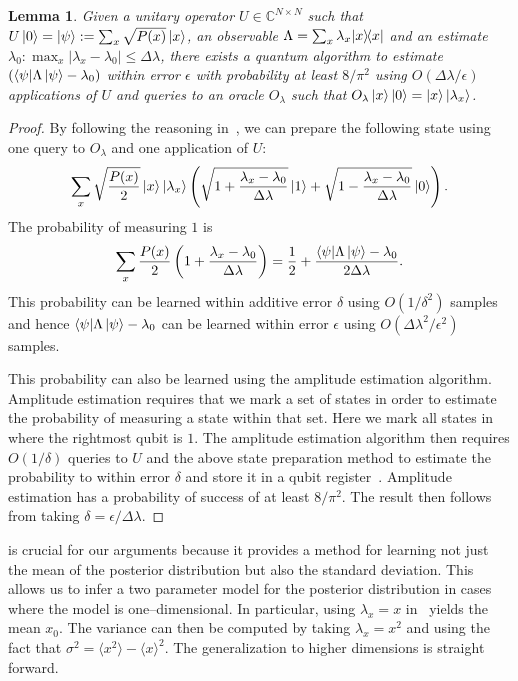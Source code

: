 \documentclass[aps,amsmath,onecolumn,amssymb]{revtex4}
\newtheorem{lemma}{Lemma}
\begin{document}
\begin{lemma}
Given a unitary operator $U\in \mathbb{C}^{N\times N}$ such that $U\left|0\right\rangle=\left|\psi\right\rangle:=\sum_x \sqrt{P(x)} \left|x\right\rangle$, an observable $\Lambda=\sum_x \lambda_x |x\rangle\!\langle x|$ and an estimate $\lambda_0:\max_x|\lambda_x-\lambda_0|\le \Delta\lambda$, there exists a quantum algorithm to estimate $(\langle\psi| \Lambda\left|\psi\right\rangle -\lambda_0)$ within error $\epsilon$ with probability at least $8/\pi^2$ using $ O(\Delta\lambda/\epsilon)$ applications of $U$ and queries to an oracle $O_\lambda$ such that $O_\lambda\left|x\right\rangle\left|0\right\rangle= \left|x\right\rangle\left|\lambda_x\right\rangle$.\label{lem:ampest}
\end{lemma}
\begin{proof}
By following the reasoning in~, we can prepare the following state using one query to $O_\lambda$ and one application of $U$:
\begin{equation}
\sum_{x} \sqrt{\frac{P(x)}{2}} \left|x\right\rangle\left|\lambda_x\right\rangle\left(\sqrt{1+\frac{\lambda_x-\lambda_0 }{\Delta \lambda}}\left|1\right\rangle + \sqrt{1-\frac{\lambda_x-\lambda_0 }{\Delta \lambda}}\left|0\right\rangle \right).\label{eq:hadtest}
\end{equation}
The probability of measuring $1$ is 
\begin{equation}
\sum_x \frac{P(x)}{2} \left(1+ \frac{\lambda_x - \lambda_0}{\Delta \lambda} \right)=\frac{1}{2} + \frac{\langle\psi| \Lambda \left|\psi\right\rangle-\lambda_0}{2\Delta \lambda}.\label{eq:mark}
\end{equation}
This probability can be learned within additive error $\delta$ using $O(1/\delta^2)$ samples and hence $\langle\psi| \Lambda \left|\psi\right\rangle-\lambda_0$ can be learned within error $\epsilon$ using $O(\Delta \lambda^2 /\epsilon^2)$ samples.

This probability can also be learned using the amplitude estimation algorithm.  Amplitude estimation requires that we mark a set of states in order to estimate the probability of measuring a state within that set.  Here we mark all states in~ where the rightmost qubit is $1$. The amplitude estimation algorithm then requires $O(1/\delta)$ queries to $U$ and the above state preparation method to estimate the probability to within error $\delta$ and store it in a qubit register~\cite{BHM+02}.  Amplitude estimation has a probability of success of at least $8/\pi^2$.  The result then follows from taking $\delta=\epsilon/\Delta \lambda$.
\end{proof}

 is crucial for our arguments because it provides a method for learning not just the mean of the posterior distribution but also the standard deviation.  This allows us to infer a two parameter model for the posterior distribution in cases where the model is one--dimensional.
In particular, using $\lambda_x = x$ in~ yields the mean $x_0$.  The variance can then be computed by taking $\lambda_x = x^2$ and using the fact that $\sigma^2 = \langle x^2\rangle-\langle x\rangle^2$.  The generalization to higher dimensions is straight forward.  
\end{document}
